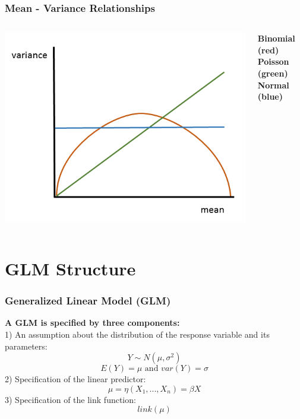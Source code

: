 \documentclass{beamer}
\begin{document}
\begin{frame}
    \frametitle{Mean - Variance Relationships}
    \begin{columns}
        \begin{column}{0.7\textwidth}
            \includegraphics[width=\textwidth]{lectures/day_9_refreshing_glm/figures/mean-variance.png}
        \end{column}
        \begin{column}{0.3\textwidth}
            \textbf{Binomial (red)} \\
            \textbf{Poisson (green)} \\
            \textbf{Normal (blue)} \\
        \end{column}
    \end{columns}
    
\end{frame}

\section{GLM Structure}

\begin{frame}[fragile]
    \frametitle{Generalized Linear Model (GLM)}
    \textbf{A GLM is specified by three components:}\\
    1) An assumption about the distribution of the response variable and its parameters:
    \[
    Y \sim N(\mu, \sigma^2)
    \]
    \[
    E(Y) = \mu \text{ and } var(Y) = \sigma
    \]
    2) Specification of the linear predictor:
    \[
    \mu = \eta(X_1, ... , X_n) = \beta X
    \]
    3) Specification of the link function:
    \[
    link(\mu)
    \]
\end{frame}
\end{document}
